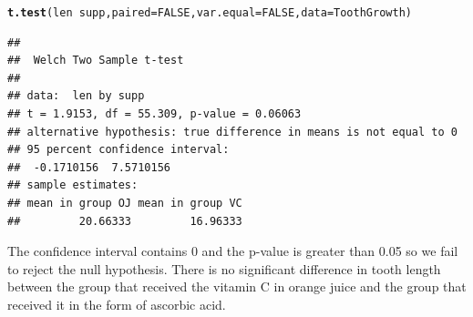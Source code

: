 \documentclass{article}\usepackage[]{graphicx}\usepackage[]{color}
\makeatletter
\newcommand{\hlnum}[1]{\textcolor[rgb]{0.686,0.059,0.569}{#1}}%
\newcommand{\hlopt}[1]{\textcolor[rgb]{0,0,0}{#1}}%
\newcommand{\hlstd}[1]{\textcolor[rgb]{0.345,0.345,0.345}{#1}}%
\newcommand{\hlkwc}[1]{\textcolor[rgb]{0.333,0.667,0.333}{#1}}%
\newcommand{\hlkwd}[1]{\textcolor[rgb]{0.737,0.353,0.396}{\textbf{#1}}}%
\newenvironment{kframe}{%
 \def\at@end@of@kframe{}%
 \ifinner\ifhmode%
  \def\at@end@of@kframe{\end{minipage}}%
  \begin{minipage}{\columnwidth}%
 \fi\fi%
 \def\FrameCommand##1{\hskip\@totalleftmargin \hskip-\fboxsep
 \colorbox{shadecolor}{##1}\hskip-\fboxsep
     \hskip-\linewidth \hskip-\@totalleftmargin \hskip\columnwidth}%
 \MakeFramed {\advance\hsize-\width
   \@totalleftmargin\z@ \linewidth\hsize
   \@setminipage}}%
 {\par\unskip\endMakeFramed%
 \at@end@of@kframe}
\newenvironment{knitrout}{}{} %
\makeatother
\begin{document}
\begin{knitrout}
\color{fgcolor}\begin{kframe}
\begin{alltt}
\hlkwd{t.test}\hlstd{(len} \hlopt{~} \hlstd{supp,} \hlkwc{paired} \hlstd{=} \hlnum{FALSE}\hlstd{,} \hlkwc{var.equal} \hlstd{=} \hlnum{FALSE}\hlstd{,} \hlkwc{data} \hlstd{= ToothGrowth)}
\end{alltt}
\begin{verbatim}
## 
## 	Welch Two Sample t-test
## 
## data:  len by supp
## t = 1.9153, df = 55.309, p-value = 0.06063
## alternative hypothesis: true difference in means is not equal to 0
## 95 percent confidence interval:
##  -0.1710156  7.5710156
## sample estimates:
## mean in group OJ mean in group VC 
##         20.66333         16.96333
\end{verbatim}
\end{kframe}
\end{knitrout}

The confidence interval contains 0 and the p-value is greater than 0.05 so we fail to reject the null hypothesis. There is no significant difference in tooth length between the group that received the vitamin C in orange juice and the group that received it in the form of ascorbic acid.
\end{document}
